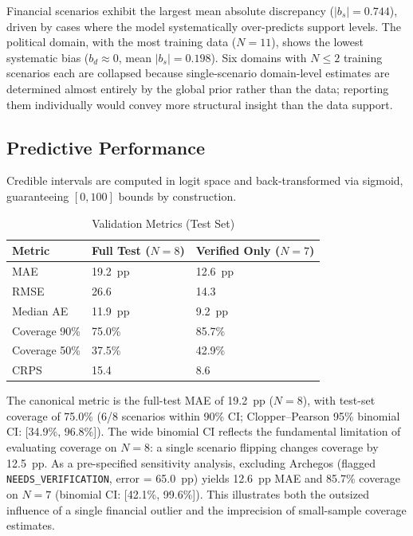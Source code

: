 \documentclass[12pt]{article}
\begin{document}
Financial scenarios exhibit the largest mean absolute discrepancy ($|b_s| = 0.744$), driven by cases where the model systematically over-predicts support levels. The political domain, with the most training data ($N = 11$), shows the lowest systematic bias ($b_d \approx 0$, mean $|b_s| = 0.198$). Six domains with $N \leq 2$ training scenarios each are collapsed because single-scenario domain-level estimates are determined almost entirely by the global prior rather than the data; reporting them individually would convey more structural insight than the data support.

\subsection{Predictive Performance}

Credible intervals are computed in logit space and back-transformed via sigmoid, guaranteeing $[0, 100]$ bounds by construction.

\begin{table}[H]
\centering
\caption{Validation Metrics (Test Set)}
\label{tab:validation_metrics}
\begin{tabular}{lll}
\toprule
Metric & Full Test ($N=8$) & Verified Only ($N=7$) \\
\midrule
MAE & 19.2~pp & 12.6~pp \\
RMSE & 26.6 & 14.3 \\
Median AE & 11.9~pp & 9.2~pp \\
Coverage 90\% & 75.0\% & 85.7\% \\
Coverage 50\% & 37.5\% & 42.9\% \\
CRPS & 15.4 & 8.6 \\
\bottomrule
\end{tabular}
\end{table}

The canonical metric is the full-test MAE of 19.2~pp ($N = 8$), with test-set coverage of 75.0\% (6/8 scenarios within 90\% CI; Clopper--Pearson 95\% binomial CI: [34.9\%, 96.8\%]). The wide binomial CI reflects the fundamental limitation of evaluating coverage on $N = 8$: a single scenario flipping changes coverage by 12.5~pp. As a pre-specified sensitivity analysis, excluding Archegos (flagged \texttt{NEEDS\_VERIFICATION}, error = 65.0~pp) yields 12.6~pp MAE and 85.7\% coverage on $N = 7$ (binomial CI: [42.1\%, 99.6\%]). This illustrates both the outsized influence of a single financial outlier and the imprecision of small-sample coverage estimates.
\end{document}
